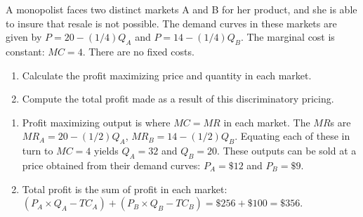 \begin{enumialphparenastyle}
\begin{ex}
\begin{sol}
\begin{center}
\end{center}
\end{sol}
\end{ex}

\begin{ex}\label{ex:ch10ex8}
A monopolist faces two distinct markets A and B for her product, and she is able to insure that resale is not possible. The demand curves in these markets are given by $P=20-(1/4)Q_A$ and $P=14-(1/4)Q_B$. The marginal cost is constant: $MC=4$. There are no fixed costs.
\begin{enumerate}
	\item	Calculate the profit maximizing price and quantity in each market.
	\item	Compute the total profit made as a result of this discriminatory pricing.
\end{enumerate}
\begin{sol}
\begin{enumerate}
	\item	Profit maximizing output is where $MC=MR$ in each market. The $MR$s are $MR_A=20-(1/2)Q_A$, $MR_B=14-(1/2)Q_B$. Equating each of these in turn to $MC=4$ yields $Q_A=32$ and $Q_B=20$. These outputs can be sold at a price obtained from their demand curves: $P_A=\$12$ and $P_B=\$9$.
	\item	Total profit is the sum of profit in each market: $(P_A\times Q_A-TC_A)+(P_B\times Q_B-TC_B)=\$256+\$100=\$356$.
\end{enumerate}
\end{sol}
\end{ex}


\end{enumialphparenastyle}
